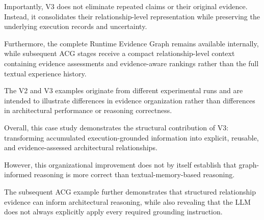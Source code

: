 Importantly, V3 does not eliminate
repeated claims or their original evidence.
Instead, it consolidates their relationship-level
representation while preserving the
underlying execution records and uncertainty.

Furthermore, the complete Runtime Evidence
Graph remains available internally, while
subsequent ACG stages receive a compact
relationship-level context containing
evidence assessments and evidence-aware
rankings rather than the full textual
experience history.

The V2 and V3 examples originate from
different experimental runs and are
intended to illustrate differences in
evidence organization rather than
differences in architectural performance
or reasoning correctness.

Overall, this case study demonstrates
the structural contribution of V3:
transforming accumulated execution-grounded
information into explicit, reusable,
and evidence-assessed architectural
relationships.

However, this organizational improvement
does not by itself establish that
graph-informed reasoning is more correct
than textual-memory-based reasoning.


The subsequent ACG example further demonstrates
that structured relationship evidence can
inform architectural reasoning, while also
revealing that the LLM does not always
explicitly apply every required grounding
instruction.


